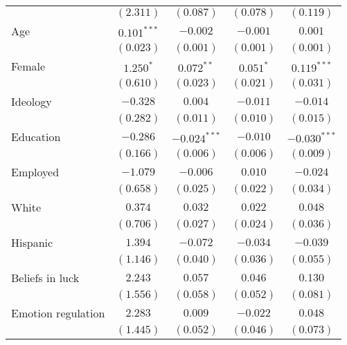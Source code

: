 \begin{table}[!t]
\begin{center}
{\begin{threeparttable}
\begin{tabular}{l c c c c}
                             & $(2.311)$      & $(0.087)$      & $(0.078)$     & $(0.119)$      \\
Age                          & $0.101^{***}$  & $-0.002$       & $-0.001$      & $0.001$        \\
                             & $(0.023)$      & $(0.001)$      & $(0.001)$     & $(0.001)$      \\
Female                       & $1.250^{*}$    & $0.072^{**}$   & $0.051^{*}$   & $0.119^{***}$  \\
                             & $(0.610)$      & $(0.023)$      & $(0.021)$     & $(0.031)$      \\
Ideology                     & $-0.328$       & $0.004$        & $-0.011$      & $-0.014$       \\
                             & $(0.282)$      & $(0.011)$      & $(0.010)$     & $(0.015)$      \\
Education                    & $-0.286$       & $-0.024^{***}$ & $-0.010$      & $-0.030^{***}$ \\
                             & $(0.166)$      & $(0.006)$      & $(0.006)$     & $(0.009)$      \\
Employed                     & $-1.079$       & $-0.006$       & $0.010$       & $-0.024$       \\
                             & $(0.658)$      & $(0.025)$      & $(0.022)$     & $(0.034)$      \\
White                        & $0.374$        & $0.032$        & $0.022$       & $0.048$        \\
                             & $(0.706)$      & $(0.027)$      & $(0.024)$     & $(0.036)$      \\
Hispanic                     & $1.394$        & $-0.072$       & $-0.034$      & $-0.039$       \\
                             & $(1.146)$      & $(0.040)$      & $(0.036)$     & $(0.055)$      \\
Beliefs in luck              & $2.243$        & $0.057$        & $0.046$       & $0.130$        \\
                             & $(1.556)$      & $(0.058)$      & $(0.052)$     & $(0.081)$      \\
Emotion regulation           & $2.283$        & $0.009$        & $-0.022$      & $0.048$        \\
                             & $(1.445)$      & $(0.052)$      & $(0.046)$     & $(0.073)$      \\

\end{tabular}
\end{threeparttable}}
\end{center}
\end{table}
